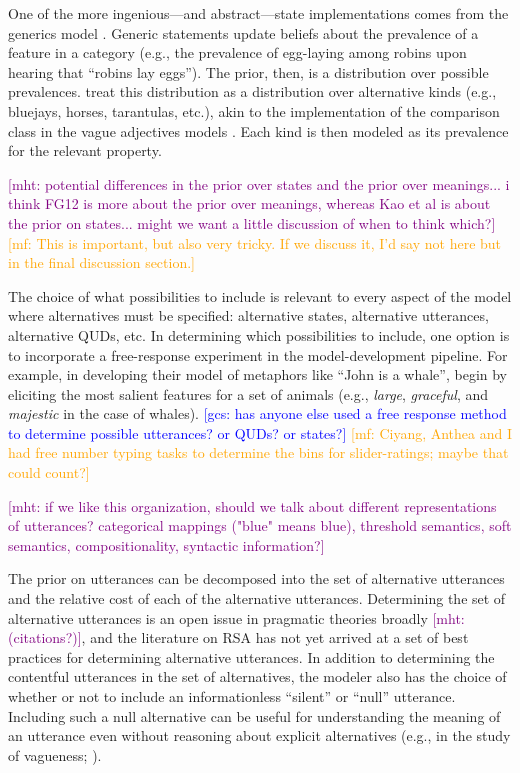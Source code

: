\documentclass{sp}
\newcommand{\gcs}[1]{\textcolor{blue}{[gcs: #1]}}
\newcommand{\mf}[1]{\textcolor{orange}{[mf: #1]}}
\newcommand{\mht}[1]{\textcolor{purple}{[mht: #1]}}
\begin{document}
One of the more ingenious---and abstract---state implementations comes from the generics model \citep{tesslergoodman2019}. Generic statements update beliefs about the prevalence of a feature in a category (e.g., the prevalence of egg-laying among robins upon hearing that ``robins lay eggs''). The prior, then, is a distribution over possible prevalences. \citeauthor{tesslergoodman2019} treat this distribution as a distribution over alternative kinds (e.g., bluejays, horses, tarantulas, etc.), akin to the implementation of the comparison class in the vague adjectives models \citep{lassitergoodman2013, tessler2017comparisonclass}. Each kind is then modeled as its prevalence for the relevant property.


\mht{potential differences in the prior over states and the prior over meanings... i think FG12 is more about the prior over meanings, whereas Kao et al is about the prior on states... might we want a little discussion of when to think which?} \mf{This is important, but also very tricky. If we discuss it, I'd say not here but in the final discussion section.}

The choice of what possibilities to include is relevant to every aspect of the model where alternatives must be specified: alternative states, alternative utterances, alternative QUDs, etc. In determining which possibilities to include, one option is to incorporate a free-response experiment in the model-development pipeline. For example, in developing their model of metaphors like ``John is a whale'', \cite{kaoetal2014metaphor} begin by eliciting the most salient features for a set of animals (e.g., \emph{large}, \emph{graceful}, and \emph{majestic} in the case of whales).
\gcs{has anyone else used a free response method to determine possible utterances? or QUDs? or states?} \mf{Ciyang, Anthea and I had free number typing tasks to determine the bins for slider-ratings; maybe that could count?}

\mht{if we like this organization, should we talk about different representations of utterances? categorical mappings ("blue" means blue), threshold semantics, soft semantics, compositionality, syntactic information?}

The prior on utterances can be decomposed into the set of alternative utterances and the relative cost of each of the alternative utterances.
Determining the set of alternative utterances is an open issue in pragmatic theories broadly \mht{(citations?)}, and the literature on RSA has not yet arrived at a set of best practices for determining alternative utterances. 
In addition to determining the contentful utterances in the set of alternatives, the modeler also has the choice of whether or not to include an informationless ``silent'' or ``null'' utterance. 
Including such a null alternative can be useful for understanding the meaning of an utterance even without reasoning about explicit alternatives (e.g., in the study of vagueness; \citealp{lassitergoodman2013}).
\end{document}
